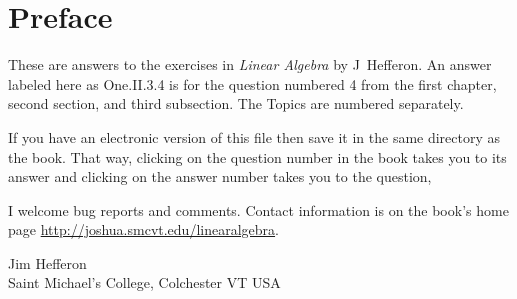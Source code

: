 \documentclass[twoside]{book}
\begin{document}

\frontmatter
\chapter*{Preface}
These are answers to the exercises in \textit{Linear Algebra} by
J~Hef{}feron.
An answer labeled here as
One.II.3.4 is for the question numbered 4 
from the first chapter,
second section, and third subsection.
The Topics are numbered separately.

If you have an electronic version of this file then
save it in the same directory as the book.
That way, 
clicking on the question number in the book takes you to its answer
and clicking on the answer number takes you to the question, 

I welcome bug reports and comments.
Contact information is on the book's home page 
\url{http://joshua.smcvt.edu/linearalgebra}.

\vspace{.5in}
\begin{raggedright}
Jim Hef{}feron     \\
Saint Michael's College, Colchester VT USA \\

\end{raggedright}
\clearemptydoublepage\tableofcontents
\setcounter{page}{1}
\mainmatter
\thispagestyle{empty}

\end{document}
